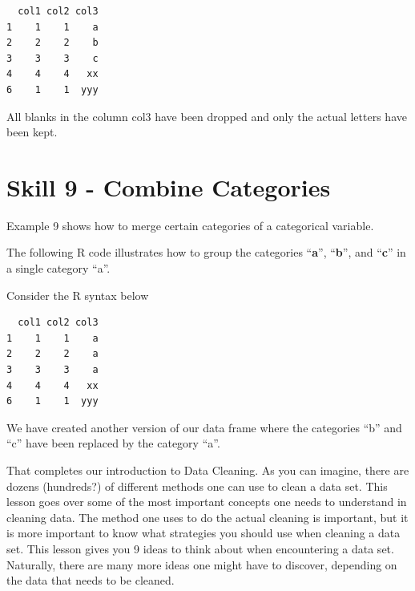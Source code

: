 \documentclass[
  letterpaper,
  DIV=11,
  numbers=noendperiod]{scrreprt}
\newenvironment{Shaded}{\begin{snugshade}}{\end{snugshade}}
\newcommand{\CommentTok}[1]{\textcolor[rgb]{0.37,0.37,0.37}{#1}}
\newcommand{\FunctionTok}[1]{\textcolor[rgb]{0.28,0.35,0.67}{#1}}
\newcommand{\NormalTok}[1]{\textcolor[rgb]{0.00,0.23,0.31}{#1}}
\newcommand{\OtherTok}[1]{\textcolor[rgb]{0.00,0.23,0.31}{#1}}
\newcommand{\SpecialCharTok}[1]{\textcolor[rgb]{0.37,0.37,0.37}{#1}}
\newcommand{\StringTok}[1]{\textcolor[rgb]{0.13,0.47,0.30}{#1}}
\begin{document}
\begin{verbatim}
  col1 col2 col3
1    1    1    a
2    2    2    b
3    3    3    c
4    4    4   xx
6    1    1  yyy
\end{verbatim}

All blanks in the column col3 have been dropped and only the actual
letters have been kept.

\section*{Skill 9 - Combine
Categories}\label{skill-9---combine-categories}


Example 9 shows how to merge certain categories of a categorical
variable.

The following R code illustrates how to group the categories
``\textbf{a}'', ``\textbf{b}'', and ``\textbf{c}'' in a single category
``a''.

Consider the R syntax below

\begin{Shaded}
\end{Shaded}

\begin{verbatim}
  col1 col2 col3
1    1    1    a
2    2    2    a
3    3    3    a
4    4    4   xx
6    1    1  yyy
\end{verbatim}

We have created another version of our data frame where the categories
``b'' and ``c'' have been replaced by the category ``a''.

That completes our introduction to Data Cleaning. As you can imagine,
there are dozens (hundreds?) of different methods one can use to clean a
data set. This lesson goes over some of the most important concepts one
needs to understand in cleaning data. The method one uses to do the
actual cleaning is important, but it is more important to know what
strategies you should use when cleaning a data set. This lesson gives
you 9 ideas to think about when encountering a data set. Naturally,
there are many more ideas one might have to discover, depending on the
data that needs to be cleaned.
\end{document}
